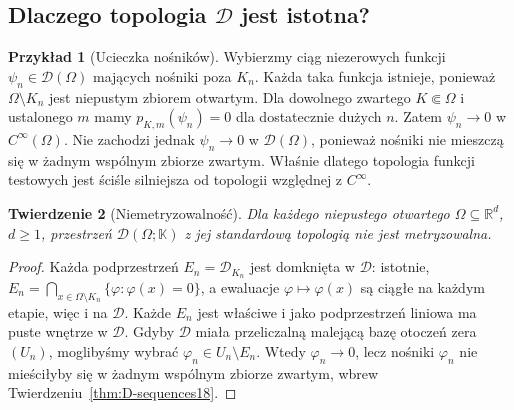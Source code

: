 \documentclass[11pt,a4paper]{article}
\numberwithin{equation}{section}
\theoremstyle{plain}
\newtheorem{twierdzenie}{Twierdzenie}[section]
\theoremstyle{definition}
\newtheorem{przyklad}[twierdzenie]{Przykład}
\theoremstyle{remark}
\newcommand{\R}{\mathbb R}
\newcommand{\K}{\mathbb K}
\begin{document}
\subsection{Dlaczego topologia \texorpdfstring{$\mathcal D$}{D} jest istotna?}

\begin{przyklad}[Ucieczka nośników]
\label{ex:escaping18}
Wybierzmy ciąg niezerowych funkcji $\psi_n\in\mathcal D(\Omega)$
mających nośniki poza $K_n$. Każda taka funkcja istnieje,
ponieważ $\Omega\setminus K_n$ jest niepustym zbiorem otwartym.
Dla dowolnego zwartego $K\Subset\Omega$ i ustalonego $m$
mamy $p_{K,m}(\psi_n)=0$ dla dostatecznie dużych $n$.
Zatem $\psi_n\to0$ w $C^\infty(\Omega)$.
Nie zachodzi jednak $\psi_n\to0$ w $\mathcal D(\Omega)$,
ponieważ nośniki nie mieszczą się w żadnym wspólnym
zbiorze zwartym. Właśnie dlatego topologia funkcji testowych
jest ściśle silniejsza od topologii względnej z $C^\infty$.
\end{przyklad}

\begin{twierdzenie}[Niemetryzowalność]
\label{thm:D-nonmetric18}
Dla każdego niepustego otwartego $\Omega\subseteq\R^d$,
$d\ge1$, przestrzeń $\mathcal D(\Omega;\K)$ z jej
standardową topologią nie jest metryzowalna.
\end{twierdzenie}
\begin{proof}
Każda podprzestrzeń $E_n=\mathcal D_{K_n}$ jest domknięta
w $\mathcal D$: istotnie,
$E_n=\bigcap_{x\in\Omega\setminus K_n}\{\varphi:\varphi(x)=0\}$,
a ewaluacje $\varphi\mapsto\varphi(x)$ są ciągłe
na każdym etapie, więc i na $\mathcal D$.
Każde $E_n$ jest właściwe i jako podprzestrzeń liniowa
ma puste wnętrze w $\mathcal D$.
Gdyby $\mathcal D$ miała przeliczalną malejącą bazę
otoczeń zera $(U_n)$, moglibyśmy wybrać
$\varphi_n\in U_n\setminus E_n$. Wtedy
$\varphi_n\to0$, lecz nośniki $\varphi_n$ nie mieściłyby
się w żadnym wspólnym zbiorze zwartym, wbrew
Twierdzeniu~\ref{thm:D-sequences18}.
\end{proof}
\end{document}
